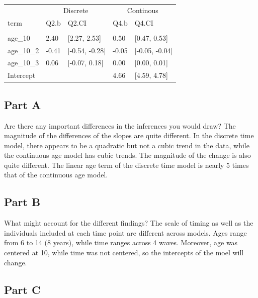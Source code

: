 \documentclass[]{article}
\begin{document}
\begin{table}[H]
\centering
\begin{tabular}{lllll}
\toprule
\multicolumn{1}{c}{ } & \multicolumn{2}{c}{Discrete} & \multicolumn{2}{c}{Continous} \\
\cmidrule(l{2pt}r{2pt}){2-3} \cmidrule(l{2pt}r{2pt}){4-5}
term & Q2.b & Q2.CI & Q4.b & Q4.CI\\
\midrule
\addlinespace[0.3em]
\multicolumn{5}{l}{\textbf{Fixed}}\\
\hspace{1em}age\_10 & 2.40 & [2.27, 2.53] & 0.50 & [0.47, 0.53]\\
\hspace{1em}age\_10\_2 & -0.41 & [-0.54, -0.28] & -0.05 & [-0.05, -0.04]\\
\hspace{1em}age\_10\_3 & 0.06 & [-0.07, 0.18] & 0.00 & [0.00, 0.01]\\
\hspace{1em}Intercept &  &  & 4.66 & [4.59, 4.78]\\
\bottomrule
\end{tabular}
\end{table}

\subsection{Part A}\label{part-a-2}

Are there any important differences in the inferences you would draw?
The magnitude of the differences of the slopes are quite different. In
the discrete time model, there appears to be a quadratic but not a cubic
trend in the data, while the continuous age model has cubic trends. The
magnitude of the change is also quite different. The linear age term of
the discrete time model is nearly 5 times that of the continuous age
model.

\subsection{Part B}\label{part-b-2}

What might account for the different findings? The scale of timing as
well as the individuals included at each time point are different across
models. Ages range from 6 to 14 (8 years), while time ranges across 4
waves. Moreover, age was centered at 10, while time was not centered, so
the intercepts of the moel will change.

\subsection{Part C}\label{part-c-1}
\end{document}
